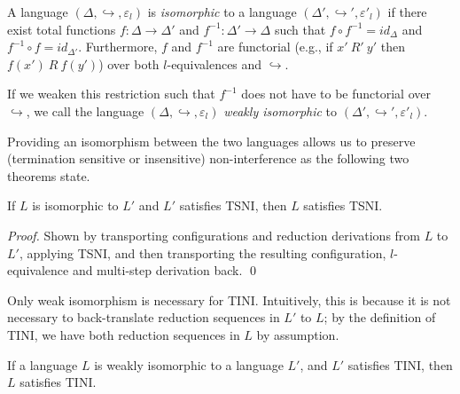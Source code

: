 \documentclass{llncs}
\newcommand{\Varid}[1]{\mathit{#1}}
\begin{document}
\begin{definition}
  A language \ensuremath{(\Delta,\hookrightarrow,\varepsilon_{l})} is \textit{isomorphic} to a
  language \ensuremath{(\Delta',\hookrightarrow',\varepsilon'_{l})} if there exist total functions \ensuremath{\Varid{f}\mathbin{:}\Delta\rightarrow\Delta'} and \ensuremath{\Varid{f}^{-1}\mathbin{:}\Delta'\rightarrow\Delta} such that \ensuremath{\Varid{f}\circ\Varid{f}^{-1}\mathrel{=}id_{\Delta}} and \ensuremath{\Varid{f}^{-1}\circ\Varid{f}\mathrel{=}id_{\Delta'}}.  Furthermore, \ensuremath{\Varid{f}} and \ensuremath{\Varid{f}^{-1}} are functorial (e.g., if
  $x'\ R'\ y'$ then $f(x')\ R\ f(y')$) over both
  $l$-equivalences and \ensuremath{\hookrightarrow}.

  If we weaken this restriction such that \ensuremath{\Varid{f}^{-1}} does
  not have to be functorial over \ensuremath{\hookrightarrow}, we call the
  language \ensuremath{(\Delta,\hookrightarrow,\varepsilon_{l})} \textit{weakly isomorphic} to
  \ensuremath{(\Delta',\hookrightarrow',\varepsilon'_{l})}.
\end{definition}

Providing an isomorphism between the two languages allows us to
preserve (termination sensitive or insensitive) non-interference
as the following two theorems state.

\begin{theorem}
  \label{thm:iso-tsni}
  If $L$ is isomorphic to $L'$ and $L'$ satisfies TSNI, then
  $L$ satisfies TSNI.
\end{theorem}

\begin{proof}
  Shown by transporting configurations and reduction derivations from
  $L$ to $L'$, applying TSNI, and then transporting the
  resulting configuration, $l$-equivalence and multi-step derivation back.
  \qed
\end{proof}

Only weak isomorphism is necessary for TINI. Intuitively, this is because
it is not necessary to back-translate reduction sequences in $L'$ to
$L$; by the definition of TINI, we have both reduction sequences in $L$
by assumption.

\begin{theorem}
  \label{thm:iso-tini}
  If a language $L$ is weakly isomorphic to a language $L'$, and $L'$
  satisfies TINI, then $L$ satisfies TINI.
\end{theorem}
\end{document}
